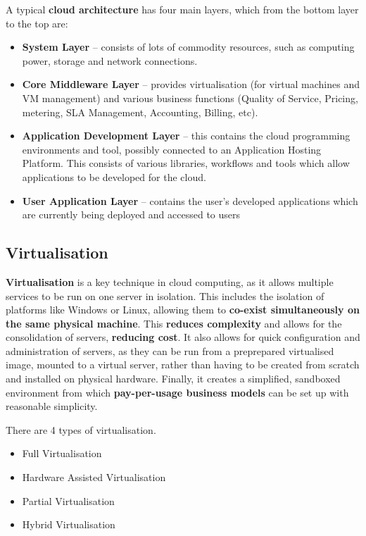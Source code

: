 \documentclass{article}
\begin{document}
A typical \textbf{cloud architecture} has four main layers, which from the bottom layer to the top are:
\begin{itemize}
	\item \textbf{System Layer} -- consists of lots of commodity resources, such as computing power, storage and network connections.
	\item \textbf{Core Middleware Layer} -- provides virtualisation (for virtual machines and VM management) and various business functions (Quality of Service, Pricing, metering, SLA Management, Accounting, Billing, etc).
	\item \textbf{Application Development Layer} -- this contains the cloud programming environments and tool, possibly connected to an Application Hosting Platform. This consists of various libraries, workflows and tools which allow applications to be developed for the cloud. 
	\item \textbf{User Application Layer} -- contains the user's developed applications which are currently being deployed and accessed to users
\end{itemize}

\subsection{Virtualisation}

\textbf{Virtualisation} is a key technique in cloud computing, as it allows multiple services to be run on one server in isolation. This includes the isolation of platforms like Windows or Linux, allowing them to \textbf{co-exist simultaneously on the same physical machine}. This \textbf{reduces complexity} and allows for the consolidation of servers, \textbf{reducing cost}. It also allows for quick configuration and administration of servers, as they can be run from a preprepared virtualised image, mounted to a virtual server, rather than having to be created from scratch and installed on physical hardware. Finally, it creates a simplified, sandboxed environment from which \textbf{pay-per-usage business models} can be set up with reasonable simplicity. 

There are 4 types of virtualisation.
\begin{itemize}
    \item Full Virtualisation
    \item Hardware Assisted Virtualisation
    \item Partial Virtualisation
    \item Hybrid Virtualisation
\end{itemize}
\end{document}
